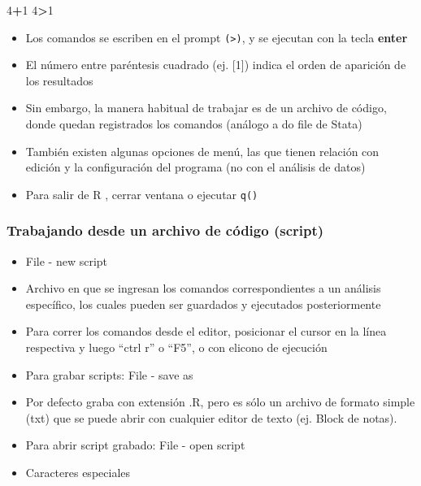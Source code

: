 \documentclass[]{article}
\newenvironment{Shaded}{\begin{snugshade}}{\end{snugshade}}
\newcommand{\DecValTok}[1]{\textcolor[rgb]{0.00,0.00,0.81}{#1}}
\newcommand{\OperatorTok}[1]{\textcolor[rgb]{0.81,0.36,0.00}{\textbf{#1}}}
\providecommand{\tightlist}{%
  \setlength{\itemsep}{0pt}\setlength{\parskip}{0pt}}
\begin{document}
\begin{Shaded}
\begin{Highlighting}[]
\DecValTok{4}\OperatorTok{+}\DecValTok{1}
\DecValTok{4}\OperatorTok{>}\DecValTok{1}
\end{Highlighting}
\end{Shaded}

\begin{itemize}
\tightlist
\item
  Los comandos se escriben en el prompt \texttt{(\textgreater{})}, y se
  ejecutan con la tecla \textbf{enter}
\item
  El número entre paréntesis cuadrado (ej. {[}1{]}) indica el orden de
  aparición de los resultados
\item
  Sin embargo, la manera habitual de trabajar es de un archivo de
  código, donde quedan registrados los comandos (análogo a do file de
  Stata)
\item
  También existen algunas opciones de menú, las que tienen relación con
  edición y la configuración del programa (no con el análisis de datos)
\item
  Para salir de R , cerrar ventana o ejecutar \texttt{q()}
\end{itemize}

\hypertarget{trabajando-desde-un-archivo-de-codigo-script}{%
\subsubsection{Trabajando desde un archivo de código
(script)}\label{trabajando-desde-un-archivo-de-codigo-script}}

\begin{itemize}
\tightlist
\item
  File - new script
\item
  Archivo en que se ingresan los comandos correspondientes a un análisis
  específico, los cuales pueden ser guardados y ejecutados
  posteriormente
\item
  Para correr los comandos desde el editor, posicionar el cursor en la
  línea respectiva y luego ``ctrl r'' o ``F5'', o con elicono de
  ejecución
\item
  Para grabar scripts: File - save as
\item
  Por defecto graba con extensión .R, pero es sólo un archivo de formato
  simple (txt) que se puede abrir con cualquier editor de texto (ej.
  Block de notas).
\item
  Para abrir script grabado: File - open script
\item
  Caracteres especiales
\end{itemize}
\end{document}
